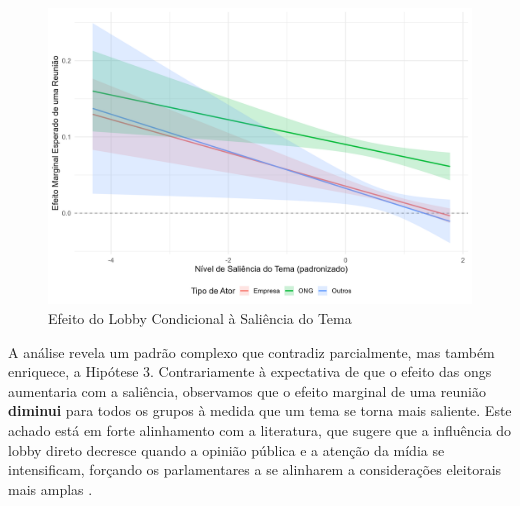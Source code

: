 % 

\begin{figure}[htbp]
    \centering
    \includegraphics[width=\textwidth]{figures/h3_test/fig_h3_marginal_effects_manual.png}
    \caption{Efeito do Lobby Condicional à Saliência do Tema}
    \label{fig:h3_marginal_effects}
\end{figure}

A análise revela um padrão complexo que contradiz parcialmente, mas também enriquece, a Hipótese 3. Contrariamente à expectativa de que o efeito das \acrshort{ong}s aumentaria com a saliência, observamos que o efeito marginal de uma reunião \textbf{diminui} para todos os grupos à medida que um tema se torna mais saliente. Este achado está em forte alinhamento com a literatura, que sugere que a influência do lobby direto decresce quando a opinião pública e a atenção da mídia se intensificam, forçando os parlamentares a se alinharem a considerações eleitorais mais amplas \cite{mahoney_lobbying_2007, kollman1998outside}.

